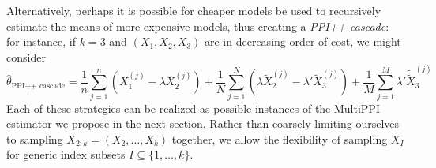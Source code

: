 \documentclass{article} %
\newcommand{\adam}[1]{ {\color{magenta}[AF: #1]}}
\newcommand{\jacob}[1]{ {\color{blue}[JE: #1]}}
\newcommand{\amirg}[1]{ {\color{green}[AG: #1]}}
\begin{document}
Alternatively, perhaps it is  possible for cheaper models be used to recursively estimate the means of more expensive models, thus creating a \textit{PPI{++} cascade}: for instance, if $k=3$ and $(X_1,X_2,X_3)$ are in decreasing order of cost, we might consider
\begin{equation}\label{eqn:cascade}
    \hat{\theta}_{\text{PPI++ cascade}} = \frac{1}{n}\sum_{j=1}^n \left(X_1^{(j)} - \lambda X_2^{(j)}\right) + \frac{1}{N}\sum_{j=1}^N\left(\lambda \tilde{X}_2^{(j)}-\lambda'\tilde{X}_3^{(j)}\right) + \frac{1}{M}\sum_{j=1}^M\lambda'\tilde{\tilde{X}}_3^{(j)}
\end{equation}
%
%
Each of these strategies can be realized as possible instances of the MultiPPI estimator we propose in the next section. Rather than coarsely limiting ourselves to sampling $X_{2:k}=(X_2,\dots,X_k)$ together, we allow the flexibility of sampling $X_I$ for generic index subsets $I\subseteq\{1,\dots,k\}$. %
\end{document}

